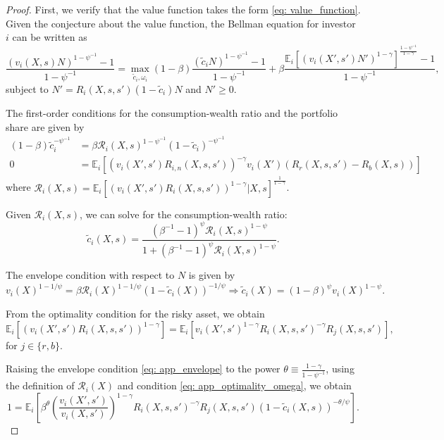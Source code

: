 \begin{proof}
First, we verify that the value function takes the form \eqref{eq: value_function}. Given the conjecture about the value function, the Bellman equation for investor $i$ can be written as
\begin{equation}
    \frac{(v_i(X,s) N)^{1-\psi^{-1}}-1}{1-\psi^{-1}} = \max_{\tilde{c}_{i},\omega_{i}}  (1-\beta) \frac{(\tilde{c}_i N)^{1-\psi^{-1}}-1}{1-\psi^{-1}} + \beta \frac{\mathbb{E}_i\left[ (v_i(X',s')N')^{1-\gamma}\right]^{\frac{1-\psi^{-1}}{1-\gamma}}-1}{1-\psi^{-1}},
\end{equation}
subject to $N' = R_{i}(X,s,s') (1-\tilde{c}_i) N$ and $N'\geq 0$.

The first-order conditions for the consumption-wealth ratio and the portfolio share are given by 
\begin{align}
    (1-\beta) \tilde{c}_i^{-\psi^{-1}} &= \beta \mathcal{R}_i(X,s)^{1-\psi^{-1}} (1-\tilde{c}_i)^{-\psi^{-1}}\\
    0& = \mathbb{E}_i\left[ (v_i(X',s') R_{i,n}(X,s,s'))^{-\gamma} v_i(X') (R_{r}(X,s,s') - R_b(X,s))  \right]
\end{align}
where $\mathcal{R}_i(X,s) = \mathbb{E}_i\left[ (v_i(X',s') R_{i}(X,s,s'))^{1-\gamma} |X,s\right]^{\frac{1}{1-\gamma}}$.

Given $\mathcal{R}_i(X,s)$, we can solve for the consumption-wealth ratio:
\begin{equation}
    \tilde{c}_i(X,s) = \frac{ (\beta^{-1}-1)^{\psi} \mathcal{R}_i(X,s)^{1-\psi}}{1+ (\beta^{-1}-1)^{\psi} \mathcal{R}_i(X,s)^{1-\psi}}.
\end{equation}

The envelope condition with respect to $N$ is given by
\begin{equation}\label{eq: app_envelope}
    v_i(X)^{1-1/\psi} = \beta \mathcal{R}_i(X) ^{1-1/\psi}  (1-\tilde{c}_i(X))^{-1/\psi} \Rightarrow 
    \tilde{c}_i(X) = (1-\beta)^{\psi} v_i(X)^{1-\psi}.
\end{equation}

From the optimality condition for the risky asset, we obtain 
\begin{equation}\label{eq: app_optimality_omega}
    \mathbb{E}_i\left[  (v_i(X',s') R_{i}(X,s,s'))^{1-\gamma}  \right] = \mathbb{E}_i\left[  v_i(X',s')^{1-\gamma} R_{i}(X,s,s')^{-\gamma} R_j(X,s,s') \right],
\end{equation}
for $j \in \{r,b\}$.

Raising the envelope condition \eqref{eq: app_envelope} to the power $\theta \equiv \frac{1-\gamma}{1-\psi^{-1}}$, using the definition of $\mathcal{R}_i(X)$ and condition \eqref{eq: app_optimality_omega}, we obtain
\begin{equation}
    1 = \mathbb{E}_i\left[ \beta^\theta \left(\frac{v_i(X',s')}{v_i(X,s')}\right)^{1-\gamma} R_{i}(X,s,s')^{-\gamma} R_j(X,s,s') (1-\tilde{c}_i(X,s))^{-\theta/\psi } \right].
\end{equation}


\end{proof}
